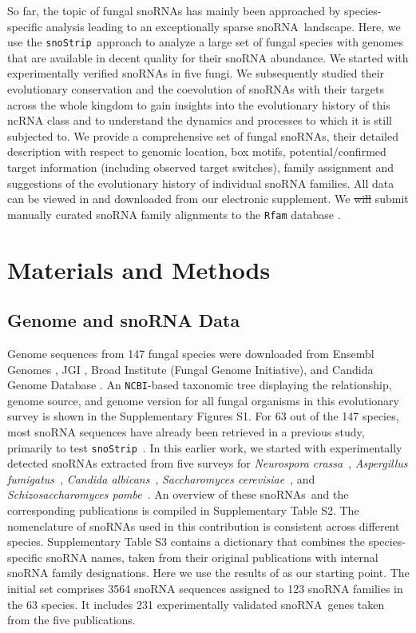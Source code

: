 \documentclass[preprint,3p,times,twocolumn]{elsarticle}
\newcommand{\PFS}[1]{\begingroup\color{green}#1\endgroup}
\newcommand{\JH}[1]{\begingroup\color{purple}#1\endgroup}
\newcommand{\snos}{snoRNAs}
\newcommand{\sno}{snoRNA}
\newcommand{\snostrip}{\texttt{snoStrip}}
\newcommand{\ncbi}{\texttt{NCBI}}
\newcommand{\Afu}{\emph{Aspergillus fumigatus}}
\newcommand{\Calb}{\emph{Candida albicans}}
\newcommand{\Spo}{\emph{Schizosaccharomyces pombe}}
\newcommand{\Ncr}{\emph{Neurospora crassa}}
\newcommand{\Sce}{\emph{Saccharomyces cerevisiae}}
\begin{document}
\PFS{So far,} the topic of fungal \sno s has mainly been approached by
species-specific analysis leading to an exceptionally sparse \sno\
landscape. Here, we use the \snostrip\ approach to analyze a large set of
fungal species with genomes that are available in decent quality for their
snoRNA abundance.  We started with experimentally verified snoRNAs in five
fungi.  We subsequently studied their evolutionary conservation and the
coevolution of snoRNAs with their targets across the whole kingdom to gain
insights into the evolutionary history of this ncRNA class and to
understand the dynamics and processes to which it is still subjected to.
We provide a comprehensive set of fungal snoRNAs, their detailed
description with respect to genomic location, box motifs,
potential/confirmed target information (including observed target
switches), family assignment and suggestions of the evolutionary history of
individual snoRNA families.  All data can be viewed in and downloaded from
our electronic supplement. We \JH{\sout{will}} submit manually curated snoRNA family
alignments to the \texttt{Rfam} database \cite{Nawrocki:2015}.


\section{Materials and Methods}

\subsection{Genome and snoRNA Data} 

Genome sequences from 147 fungal species were downloaded from Ensembl
Genomes \cite{Kersey:2016}, JGI \cite{Nordberg:2014}, Broad Institute
(Fungal Genome Initiative), and Candida Genome Database
\cite{Skrzypek:2017}.  An \ncbi-based taxonomic tree displaying the
relationship, genome source, and genome version for all fungal organisms in this
evolutionary survey is shown in the Supplementary Figures S1.  For 63 out
of the 147 species, most snoRNA sequences have already been retrieved in a
previous study, primarily to test \snostrip\ \cite{Bartschat:2014}.  In
this earlier work, we started with experimentally detected snoRNAs
extracted from five surveys for \Ncr\ \cite{Liu:2009}, \Afu\
\cite{Joechl:2008}, \Calb\ \cite{Mitrovich:2010}, \Sce\
\cite{Piekna-Przybylska:2007}, and \Spo\ \cite{Li:2005}. An overview of these 
\snos\ and the corresponding publications is
compiled in Supplementary Table S2. The nomenclature of snoRNAs \PFS{used
  in this contribution} is consistent across different species.
Supplementary Table S3 contains a dictionary that combines the
species-specific snoRNA names, taken from their original publications with
internal snoRNA family designations.  Here we use the results of
\cite{Bartschat:2014} as our starting point.  The initial set comprises
3564 snoRNA sequences assigned to 123 snoRNA families in the 63 species. It
includes 231 experimentally validated \sno\ genes taken from the five
publications.
\end{document}
